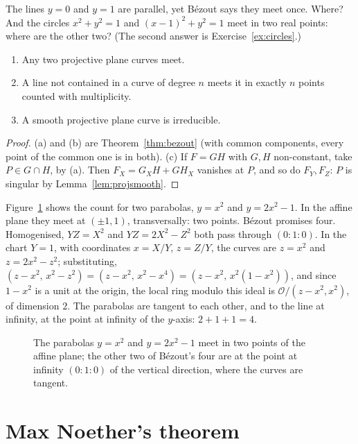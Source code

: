 \begin{think}
The lines $y=0$ and $y=1$ are parallel, yet B\'ezout says they meet once. Where? And the circles $x^2+y^2=1$ and $(x-1)^2+y^2=1$ meet in
two real points: where are the other two? (The second answer is Exercise~\ref{ex:circles}.)
\end{think}

\begin{corollary}\label{cor:bezoutcons}
\begin{enumerate}[label=(\alph*)]
\item Any two projective plane curves meet.
\item A line not contained in a curve of degree $n$ meets it in exactly $n$ points counted with multiplicity.
\item A smooth projective plane curve is irreducible.
\end{enumerate}
\end{corollary}
\begin{proof}
(a) and (b) are Theorem~\ref{thm:bezout} (with common components, every point of the common one is in both). (c) If $F=GH$ with $G,H$ non-constant, take
$P\in G\cap H$, by (a). Then $F_X=G_XH+GH_X$ vanishes at $P$, and so do $F_Y,F_Z$: $P$ is singular by Lemma~\ref{lem:projsmooth}.
\end{proof}

Figure~\ref{fig:bezout} shows the count for two parabolas, $y=x^2$ and $y=2x^2-1$. In the affine plane they meet at $(\pm1,1)$, transversally:
two points. B\'ezout promises four. Homogenised, $YZ=X^2$ and $YZ=2X^2-Z^2$ both pass through $(0:1:0)$. In the chart $Y=1$, with coordinates
$x=X/Y$, $z=Z/Y$, the curves are $z=x^2$ and $z=2x^2-z^2$; substituting, $(z-x^2,\,x^2-z^2)=(z-x^2,\,x^2-x^4)=(z-x^2,\,x^2(1-x^2))$, and since $1-x^2$ is a unit
at the origin, the local ring modulo this ideal is $\mathcal O/(z-x^2,x^2)$, of dimension $2$. The parabolas are tangent to each other, and to the
line at infinity, at the point at infinity of the $y$-axis: $2+1+1=4$.

\begin{figure}[ht]
\centering{}
\caption{The parabolas $y=x^2$ and $y=2x^2-1$ meet in two points of the affine plane; the other two of B\'ezout's four are at the point at infinity
$(0:1:0)$ of the vertical direction, where the curves are tangent.}
\label{fig:bezout}
\end{figure}

\section{Max Noether's theorem}

